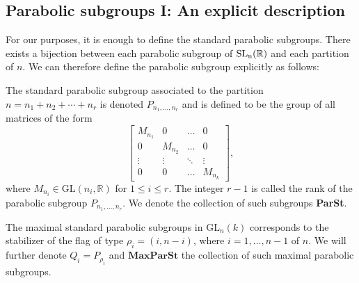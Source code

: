 \subsection{Parabolic subgroups I: An explicit description }
For our purposes, it is enough to define the standard parabolic subgroups.  There exists a bijection between each parabolic subgroup of $\operatorname{\text{SL}_n(\mathbb{R})}$
and each partition of $n$. We can therefore define the parabolic subgroup explicitly as follows:
\begin{definition}
    The standard parabolic subgroup associated to the partition $n = n_1 + n_2 + \cdots + n_r$ is denoted $P_{n_1,\ldots,n_r}$ and is defined to be the group of all matrices of the form
    \[
        \begin{bmatrix}
            M_{n_1} & 0       & \ldots & 0       \\
            0       & M_{n_2} & \ldots & 0       \\
            \vdots  & \vdots  & \ddots & \vdots  \\
            0       & 0       & \ldots & M_{n_k}
        \end{bmatrix} ,
    \]
    where $M_{n_i} \in \mathrm{GL}(n_i, \mathbb{R})$ for $1 \leq i \leq r$. The integer $r-1$ is called the rank of the parabolic subgroup $P_{n_1,\ldots,n_r}$.
    We denote the collection of such subgroups \textbf{ParSt}.
\end{definition}

\begin{definition}
    The maximal standard parabolic subgroups in $\text{GL}_n(k)$ corresponds to the
    stabilizer of the flag of type $\rho_i =(i,n-i)$, where $i = 1,\ldots,n-1$ of $n$. We will
    further denote $Q_i = P_{\rho_i}$ and $\textbf{MaxParSt}$ the collection of such maximal parabolic subgroups.
\end{definition}

